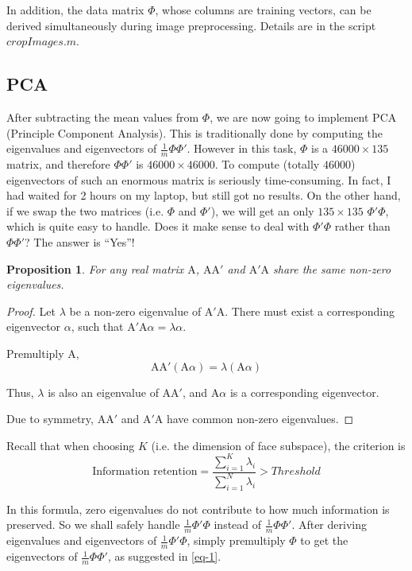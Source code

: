\documentclass{article}
\newcommand*{\A}{\mathrm{A}}
\newcommand*{\sumi}{\sum_{i=1}^}
\theoremstyle{plain} \newtheorem{prop}{Proposition}
\begin{document}
In addition, the data matrix $\Phi$, whose columns are training vectors, can be derived simultaneously during image preprocessing. Details are in the script \hyperref[code-1]{$cropImages.m$}.

\subsection{PCA}
After subtracting the mean values from $\Phi$, we are now going to implement PCA (Principle Component Analysis). This is traditionally done by computing the eigenvalues and eigenvectors of $\frac{1}{m}\Phi\Phi'$. However in this task, $\Phi$ is a $46000\times135$ matrix, and therefore $\Phi\Phi'$ is $46000\times46000$. To compute (totally $46000$) eigenvectors of such an enormous matrix is seriously time-consuming. In fact, I had waited for 2 hours on my laptop, but still got no results. On the other hand, if we swap the two matrices (i.e. $\Phi$ and $\Phi'$), we will get an only $135\times135$ $\Phi'\Phi$, which is quite easy to handle. Does it make sense to deal with $\Phi'\Phi$ rather than $\Phi\Phi'$? The answer is ``Yes''!

\begin{prop}
For any real matrix $\A$, $\A\A'$ and $\A'\A$ share the same non-zero eigenvalues.
\end{prop}
\begin{proof}
Let $\lambda$ be a non-zero eigenvalue of $\A'\A$. There must exist a corresponding eigenvector $\alpha$, such that $\A'\A\alpha = \lambda\alpha$.

Premultiply $\A$,
\begin{equation}
\label{eq-1}
\A\A'(\A\alpha) = \lambda(\A\alpha)
\end{equation}

Thus, $\lambda$ is also an eigenvalue of $\A\A'$, and $\A\alpha$ is a corresponding eigenvector.

Due to symmetry, $\A\A'$ and $\A'\A$ have common non-zero eigenvalues.
\end{proof}

Recall that when choosing $K$ (i.e. the dimension of face subspace), the criterion is
\begin{equation}
\text{Information retention} = \frac{\sumi{K}\lambda_i}{\sumi{N}\lambda_i} > Threshold
\end{equation}

In this formula, zero eigenvalues do not contribute to how much information is preserved. So we shall safely handle $\frac{1}{m}\Phi'\Phi$ instead of $\frac{1}{m}\Phi\Phi'$. After deriving eigenvalues and eigenvectors of $\frac{1}{m}\Phi'\Phi$, simply premultiply $\Phi$ to get the eigenvectors of $\frac{1}{m}\Phi\Phi'$, as suggested in \eqref{eq-1}.
\end{document}

